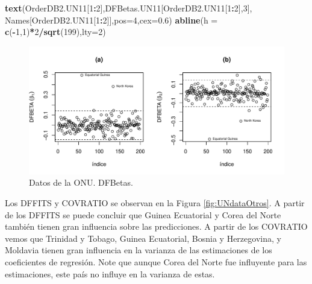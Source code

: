 \documentclass[
]{article}
\newenvironment{Shaded}{\begin{snugshade}}{\end{snugshade}}
\newcommand{\AttributeTok}[1]{\textcolor[rgb]{0.13,0.29,0.53}{#1}}
\newcommand{\DecValTok}[1]{\textcolor[rgb]{0.00,0.00,0.81}{#1}}
\newcommand{\FloatTok}[1]{\textcolor[rgb]{0.00,0.00,0.81}{#1}}
\newcommand{\FunctionTok}[1]{\textcolor[rgb]{0.13,0.29,0.53}{\textbf{#1}}}
\newcommand{\NormalTok}[1]{#1}
\newcommand{\SpecialCharTok}[1]{\textcolor[rgb]{0.81,0.36,0.00}{\textbf{#1}}}
\begin{document}
\begin{Shaded}
\begin{Highlighting}[]
\FunctionTok{text}\NormalTok{(OrderDB2.UN11[}\DecValTok{1}\SpecialCharTok{:}\DecValTok{2}\NormalTok{],DFBetas.UN11[OrderDB2.UN11[}\DecValTok{1}\SpecialCharTok{:}\DecValTok{2}\NormalTok{],}\DecValTok{3}\NormalTok{],}
\NormalTok{     Names[OrderDB2.UN11[}\DecValTok{1}\SpecialCharTok{:}\DecValTok{2}\NormalTok{]],}\AttributeTok{pos=}\DecValTok{4}\NormalTok{,}\AttributeTok{cex=}\FloatTok{0.6}\NormalTok{)}
\FunctionTok{abline}\NormalTok{(}\AttributeTok{h =} \FunctionTok{c}\NormalTok{(}\SpecialCharTok{{-}}\DecValTok{1}\NormalTok{,}\DecValTok{1}\NormalTok{)}\SpecialCharTok{*}\DecValTok{2}\SpecialCharTok{/}\FunctionTok{sqrt}\NormalTok{(}\DecValTok{199}\NormalTok{),}\AttributeTok{lty=}\DecValTok{2}\NormalTok{)}
\end{Highlighting}
\end{Shaded}

\begin{figure}

{\centering \includegraphics{MLG1_files/figure-latex/UNdataDfBetas-1} 

}

\caption{Datos de la ONU. DFBetas.}\label{fig:UNdataDfBetas}
\end{figure}

Los DFFITS y COVRATIO se observan en la Figura \ref{fig:UNdataOtros}. A partir de los DFFITS se puede concluir que Guinea Ecuatorial y Corea del Norte también tienen gran influencia sobre las predicciones. A partir de los COVRATIO vemos que Trinidad y Tobago, Guinea Ecuatorial, Bosnia y Herzegovina, y Moldavia tienen gran influencia en la varianza de las estimaciones de los coeficientes de regresión. Note que aunque Corea del Norte fue influyente para las estimaciones, este país no influye en la varianza de estas.
\end{document}
